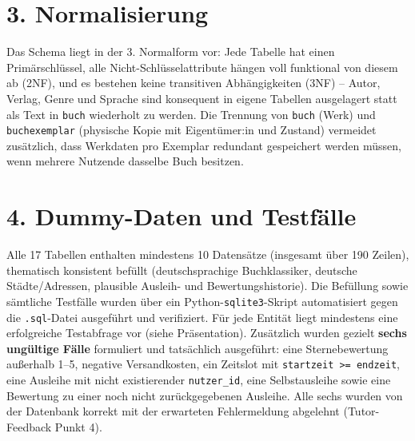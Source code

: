 \documentclass[11pt,a4paper]{article}
\begin{document}
\section*{3. Normalisierung}
Das Schema liegt in der 3. Normalform vor: Jede Tabelle hat einen Primärschlüssel, alle Nicht-Schlüsselattribute hängen voll funktional von diesem ab (2NF), und es bestehen keine transitiven Abhängigkeiten (3NF) -- Autor, Verlag, Genre und Sprache sind konsequent in eigene Tabellen ausgelagert statt als Text in \texttt{buch} wiederholt zu werden. Die Trennung von \texttt{buch} (Werk) und \texttt{buchexemplar} (physische Kopie mit Eigentümer:in und Zustand) vermeidet zusätzlich, dass Werkdaten pro Exemplar redundant gespeichert werden müssen, wenn mehrere Nutzende dasselbe Buch besitzen.

\section*{4. Dummy-Daten und Testfälle}
Alle 17 Tabellen enthalten mindestens 10 Datensätze (insgesamt über 190 Zeilen), thematisch konsistent befüllt (deutschsprachige Buchklassiker, deutsche Städte/Adressen, plausible Ausleih- und Bewertungshistorie). Die Befüllung sowie sämtliche Testfälle wurden über ein Python-\texttt{sqlite3}-Skript automatisiert gegen die \texttt{.sql}-Datei ausgeführt und verifiziert. Für jede Entität liegt mindestens eine erfolgreiche Testabfrage vor (siehe Präsentation). Zusätzlich wurden gezielt \textbf{sechs ungültige Fälle} formuliert und tatsächlich ausgeführt: eine Sternebewertung außerhalb 1--5, negative Versandkosten, ein Zeitslot mit \texttt{startzeit >= endzeit}, eine Ausleihe mit nicht existierender \texttt{nutzer\_id}, eine Selbstausleihe sowie eine Bewertung zu einer noch nicht zurückgegebenen Ausleihe. Alle sechs wurden von der Datenbank korrekt mit der erwarteten Fehlermeldung abgelehnt (Tutor-Feedback Punkt 4).

\end{document}
